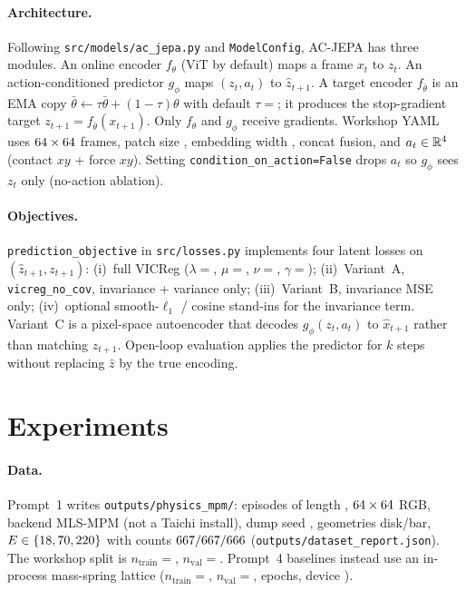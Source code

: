 \documentclass{article}
\begin{document}
\paragraph{Architecture.}
Following \texttt{src/models/ac\_jepa.py} and \texttt{ModelConfig}, AC-JEPA has
three modules. An online encoder $f_\theta$ (ViT by default) maps a frame
$x_t$ to $z_t$. An action-conditioned predictor $g_\phi$ maps $(z_t,a_t)$ to
$\hat z_{t+1}$. A target encoder $f_{\bar\theta}$ is an EMA copy
$\bar\theta \leftarrow \tau\bar\theta + (1-\tau)\theta$ with default
$\tau{=}$\EmaTau{}; it produces the stop-gradient target $z_{t+1}=f_{\bar\theta}(x_{t+1})$.
Only $f_\theta$ and $g_\phi$ receive gradients. Workshop YAML uses
$64\times64$ frames, patch size \PatchSize{}, embedding width
\ZTLatentDim{}, concat fusion, and $a_t\in\mathbb{R}^{4{}}$
(contact $xy$ + force $xy$). Setting \texttt{condition\_on\_action=False} drops
$a_t$ so $g_\phi$ sees $z_t$ only (no-action ablation).

\paragraph{Objectives.}
\texttt{prediction\_objective} in \texttt{src/losses.py} implements four latent
losses on $(\hat z_{t+1}, z_{t+1})$: (i)~full VICReg
($\lambda{=}$\VicregSim{}, $\mu{=}$\VicregStd{}, $\nu{=}$\VicregCov{}, $\gamma{=}$\VicregGamma{});
(ii)~Variant~A, \texttt{vicreg\_no\_cov}, invariance + variance only;
(iii)~Variant~B, invariance MSE only;
(iv)~optional smooth-$\ell_1$ / cosine stand-ins for the invariance term.
Variant~C is a pixel-space autoencoder that decodes $g_\phi(z_t,a_t)$ to
$\hat x_{t+1}$ rather than matching $z_{t+1}$. Open-loop evaluation applies the
predictor for $k$ steps without replacing $\hat z$ by the true encoding.

\section{Experiments}
\paragraph{Data.}
Prompt~1 writes \texttt{outputs/physics\_mpm/}: \NEpisodes{} episodes of length
\EpisodeLength{}, $64\times64$ RGB, backend \texttt{\DumpBackend{}}
MLS-MPM (not a Taichi install), dump seed \DumpSeed{}, geometries disk/bar,
$E\in\{18,70,220\}$ with counts
$667/667/666$ (\texttt{outputs/dataset\_report.json}).
The workshop split is $n_{\mathrm{train}}{=}$\NTrainPhysics{},
$n_{\mathrm{val}}{=}$\NValPhysics{}. Prompt~4 baselines instead use an
in-process mass-spring lattice
($n_{\mathrm{train}}{=}$\BaselineNTrain{}, $n_{\mathrm{val}}{=}$\BaselineNVal{},
\BaselineEpochs{} epochs, device \texttt{\BaselineDevice{}}).
\end{document}
